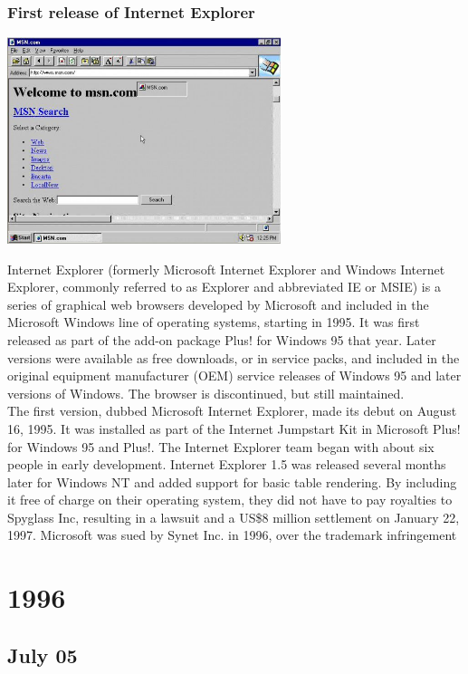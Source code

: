 \documentclass[11pt]{report}
\begin{document}
\subsection{First release of Internet Explorer}
\vspace{2mm}\begin{center}\includegraphics[width=8cm]{./img/internetExplorer.jpg}\end{center}
Internet Explorer (formerly Microsoft Internet Explorer and Windows Internet Explorer, commonly referred to as Explorer and abbreviated IE or MSIE) is a series of graphical web browsers developed by Microsoft and included in the Microsoft Windows line of operating systems, starting in 1995. It was first released as part of the add-on package Plus! for Windows 95 that year. Later versions were available as free downloads, or in service packs, and included in the original equipment manufacturer (OEM) service releases of Windows 95 and later versions of Windows. The browser is discontinued, but still maintained.\\

The first version, dubbed Microsoft Internet Explorer, made its debut on August 16, 1995. It was installed as part of the Internet Jumpstart Kit in Microsoft Plus! for Windows 95 and Plus!. The Internet Explorer team began with about six people in early development. Internet Explorer 1.5 was released several months later for Windows NT and added support for basic table rendering. By including it free of charge on their operating system, they did not have to pay royalties to Spyglass Inc, resulting in a lawsuit and a US\$8 million settlement on January 22, 1997.
Microsoft was sued by Synet Inc. in 1996, over the trademark infringement

\chapter{1996}
\section{July 05}
\end{document}
